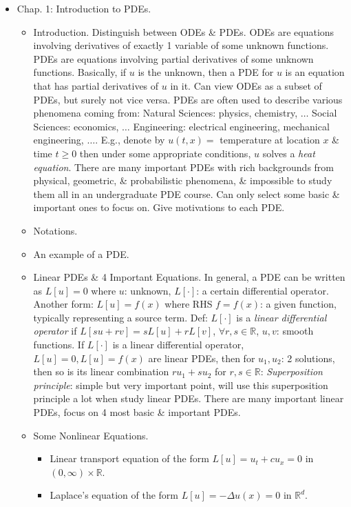 \documentclass{article}
\begin{document}
\begin{enumerate}
	\begin{itemize}
		\item {\sf Chap. 1: Introduction to PDEs.}
		\begin{itemize}
			\item {\sf Introduction.} Distinguish between ODEs \& PDEs. ODEs are equations involving derivatives of exactly 1 variable of some unknown functions. PDEs are equations involving partial derivatives of some unknown functions. Basically, if $u$ is the unknown, then a PDE for $u$ is an equation that has partial derivatives of $u$ in it. Can view ODEs as a subset of PDEs, but surely not vice versa. PDEs are often used to describe various phenomena coming from: Natural Sciences: physics, chemistry, $\ldots$ Social Sciences: economics, $\ldots$ Engineering: electrical engineering, mechanical engineering, $\ldots$. E.g., denote by $u(t,x) =$ temperature at location $x$ \& time $t\ge0$ then under some appropriate conditions, $u$ solves a {\it heat equation}. There are many important PDEs with rich backgrounds from physical, geometric, \& probabilistic phenomena, \& impossible to study them all in an undergraduate PDE course. Can only select some basic \& important ones to focus on. Give motivations to each PDE.
			\item {\sf Notations.}
			\item {\sf An example of a PDE.}
			\item {\sf Linear PDEs \& 4 Important Equations.} In general, a PDE can be written as $L[u] = 0$ where $u$: unknown, $L[\cdot]$: a certain differential operator. Another form: $L[u] = f(x)$ where RHS $f = f(x)$: a given function, typically representing a source term. Def: $L[\cdot]$ is a \emph{linear differential operator} if $L[su + rv] = sL[u] + rL[v]$, $\forall r,s\in\mathbb{R}$, $u,v$: smooth functions. If $L[\cdot]$ is a linear differential operator, $L[u] = 0,L[u] = f(x)$ are linear PDEs, then for $u_1,u_2$: 2 solutions, then so is its linear combination $ru_1 + su_2$ for $r,s\in\mathbb{R}$: {\it Superposition principle}: simple but very important point, will use this superposition principle a lot when study linear PDEs. There are many important linear PDEs, focus on 4 most basic \& important PDEs.
			\item {\sf Some Nonlinear Equations.}
			\begin{itemize}
				\item {\sf Linear transport equation} of the form $L[u] = u_t + cu_x = 0$ in $(0,\infty)\times\mathbb{R}$.
				\item {\sf Laplace's equation} of the form $L[u] = -\Delta u(x) = 0$ in $\mathbb{R}^d$.

\end{itemize}
\end{itemize}
\end{itemize}
\end{enumerate}
\end{document}

